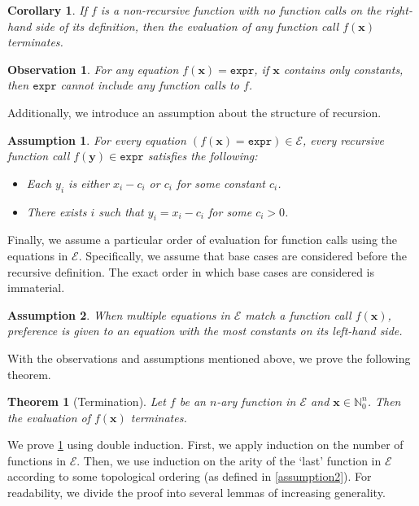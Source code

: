 \documentclass[letterpaper]{article} %
\newtheorem{theorem}{Theorem}
\newtheorem{assumption}{Assumption}
\newtheorem{corollary}{Corollary}
\newtheorem{fact}{Observation}
\theoremstyle{remark}
\theoremstyle{definition}
\newcommand{\expr}{\mathtt{expr}}
\begin{document}
\begin{corollary}\label{fact}
  If $f$ is a non-recursive function with no function calls on the right-hand
  side of its definition, then the evaluation of any function call
  $f(\mathbf{x})$ terminates.
\end{corollary}

\begin{fact}\label{fact2}
  For any equation $f(\mathbf{x}) = \expr{}$, if $\mathbf{x}$ contains only
  constants, then $\expr{}$ cannot include any function calls to $f$.
\end{fact}

Additionally, we introduce an assumption about the structure of recursion.

\begin{assumption}\label{assumption4}
  For every equation $(f(\mathbf{x}) = \expr) \in \mathcal{E}$, every recursive
  function call $f(\mathbf{y}) \in \expr$ satisfies the
  following:
  \begin{itemize}
    \item Each $y_{i}$ is either $x_{i} - c_{i}$ or $c_{i}$ for some constant
          $c_{i}$.
    \item There exists $i$ such that $y_{i} = x_{i} - c_{i}$ for some
          $c_{i} > 0$.
  \end{itemize}
\end{assumption}

Finally, we assume a particular order of evaluation for function calls using the
equations in $\mathcal{E}$. Specifically, we assume that base cases are
considered before the recursive definition. The exact order in which base cases
are considered is immaterial.

\begin{assumption}
  When multiple equations in $\mathcal{E}$ match a function call
  $f(\mathbf{x})$, preference is given to an equation with the most constants on
  its left-hand side.
\end{assumption}

With the observations and assumptions mentioned above, we prove the following
theorem.

\begin{theorem}[Termination]\label{thm:halting}
  Let $f$ be an $n$-ary function in $\mathcal{E}$ and
  $\mathbf{x} \in \mathbb{N}_{0}^{n}$. Then the evaluation of $f(\mathbf{x})$
  terminates.
\end{theorem}

We prove \cref{thm:halting} using double induction. First, we apply induction on
the number of functions in $\mathcal{E}$. Then, we use induction on the arity of
the `last' function in $\mathcal{E}$ according to some topological ordering (as
defined in \cref{assumption2}). For readability, we divide the proof into
several lemmas of increasing generality.
\end{document}
